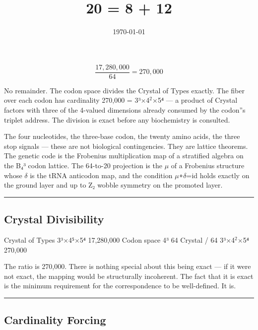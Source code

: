 \documentclass[12pt,a4paper]{article}
\begin{document}
\title{20 = 8 + 12}
\date{\today}

\maketitle

\[\frac{17,280,000}{64} = 270,000\]

No remainder. The codon space divides the Crystal of Types exactly. The fiber over each codon has cardinality 270,000 = 3³$\times$4$^{2}$$\times$5⁴ --- a product of Crystal factors with three of the 4-valued dimensions already consumed by the codon''s triplet address. The division is exact before any biochemistry is consulted.

The four nucleotides, the three-base codon, the twenty amino acids, the three stop signals --- these are not biological contingencies. They are lattice theorems. The genetic code is the Frobenius multiplication map of a stratified algebra on the B₄³ codon lattice. The 64-to-20 projection is the $\mu$ of a Frobenius structure whose $\delta$ is the tRNA anticodon map, and the condition $\mu$∘$\delta$=id holds exactly on the ground layer and up to Z₂ wobble symmetry on the promoted layer.

\begin{center}
\rule{0.5\textwidth}{0.4pt}
\end{center}

\subsection{Crystal Divisibility}

\textbar{} Crystal of Types \textbar{} 3³$\times$4⁵$\times$5⁴ \textbar{} 17,280,000 \textbar{}
\textbar{} Codon space \textbar{} 4³ \textbar{} 64 \textbar{}
\textbar{} Crystal / 64 \textbar{} 3³$\times$4$^{2}$$\times$5⁴ \textbar{} 270,000 \textbar{}

The ratio is 270,000. There is nothing special about this being exact --- if it were not exact, the mapping would be structurally incoherent. The fact that it is exact is the minimum requirement for the correspondence to be well-defined. It is.

\begin{center}
\rule{0.5\textwidth}{0.4pt}
\end{center}

\subsection{Cardinality Forcing}
\end{document}
